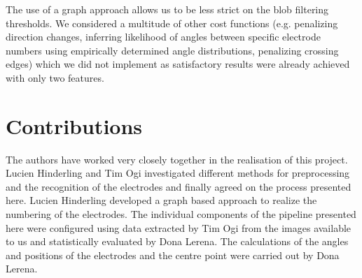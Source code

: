 \documentclass[a4paper, 11pt]{article}
\begin{document}
The use of a graph approach allows us to be less strict on the blob filtering thresholds. We considered a multitude of other cost functions (e.g. penalizing direction changes, inferring likelihood of angles between specific electrode numbers using empirically determined angle distributions, penalizing crossing edges) which we did not implement as satisfactory results were already achieved with only two features.



\section{Contributions}
The authors have worked very closely together in the realisation of this project. Lucien Hinderling and Tim Ogi investigated different methods for preprocessing and the recognition of the electrodes and finally agreed on the process presented here. Lucien Hinderling developed a graph based approach to realize the numbering of the electrodes. The individual components of the pipeline presented here were configured using data extracted by Tim Ogi from the images available to us and statistically evaluated by Dona Lerena. The calculations of the angles and positions of the electrodes and the centre point were carried out by Dona Lerena.




\end{document}
